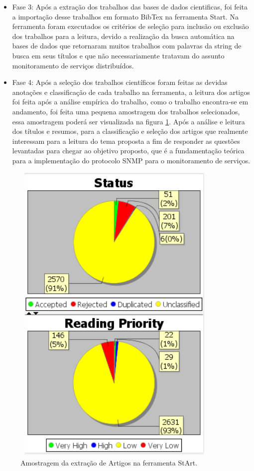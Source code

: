 \begin{itemize}
\item Fase 3: Após a extração dos trabalhos das bases de dados cientificas, foi feita a importação desse trabalhos em formato BibTex\cite{chomsky1969linguistica} na ferramenta Start. Na ferramenta foram executados os critérios de seleção para inclusão ou exclusão dos trabalhos para a leitura, devido a realização da busca automática na bases de dados que retornaram muitos trabalhos com palavras da string de busca em seus títulos e que não necessariamente tratavam do assunto monitoramento de serviços distribuídos.

\item Fase 4: Após a seleção dos trabalhos científicos foram feitas as devidas anotações e classificação de cada trabalho na ferramenta, a leitura dos artigos foi feita após a análise empírica do trabalho, como o trabalho encontra-se em andamento, foi feita uma pequena amostragem dos trabalhos selecionados, essa amostragem poderá ser visualizada na figura \ref{fig:StArt}. Após a análise e leitura dos títulos e resumos, para a classificação e seleção dos artigos que realmente interessam para a leitura do tema proposta a fim de responder as questões levantadas para chegar ao objetivo proposto, que é a fundamentação teórica para a implementação do protocolo SNMP para o monitoramento de serviços. 
\end{itemize}

\begin{figure}[!ht]
\centering
\includegraphics[width = 10cm, height=15cm]{img/extra__oRSLStArt.png}
\caption{Amostragem da extração de Artigos na ferramenta StArt.}
\label{fig:StArt}
\end{figure}



